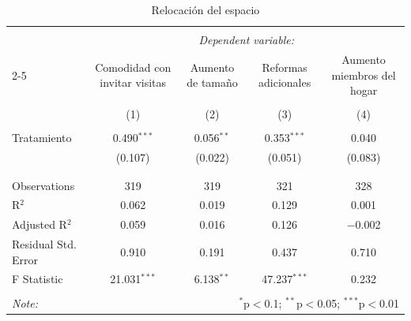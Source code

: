 
\begin{table}[H] \centering 
  \caption{Relocación del espacio} 
  \label{reg_relocation} 
\tiny 
\begin{tabular}{@{\extracolsep{-7pt}}lcccc} 
\\[-1.8ex]\hline 
\hline \\[-1.8ex] 
 & \multicolumn{4}{c}{\textit{Dependent variable:}} \\ 
\cline{2-5} 
 & Comodidad con invitar visitas & Aumento de tamaño & Reformas adicionales & Aumento miembros del hogar \\ 
\\[-1.8ex] & (1) & (2) & (3) & (4)\\ 
\hline \\[-1.8ex] 
 Tratamiento & 0.490$^{***}$ & 0.056$^{**}$ & 0.353$^{***}$ & 0.040 \\ 
  & (0.107) & (0.022) & (0.051) & (0.083) \\ 
  & & & & \\ 
\hline \\[-1.8ex] 
Observations & 319 & 319 & 321 & 328 \\ 
R$^{2}$ & 0.062 & 0.019 & 0.129 & 0.001 \\ 
Adjusted R$^{2}$ & 0.059 & 0.016 & 0.126 & $-$0.002 \\ 
Residual Std. Error & 0.910 & 0.191 & 0.437 & 0.710 \\ 
F Statistic & 21.031$^{***}$ & 6.138$^{**}$ & 47.237$^{***}$ & 0.232 \\ 
\hline 
\hline \\[-1.8ex] 
\textit{Note:}  & \multicolumn{4}{r}{$^{*}$p$<$0.1; $^{**}$p$<$0.05; $^{***}$p$<$0.01} \\ 
\end{tabular} 
\end{table} 
